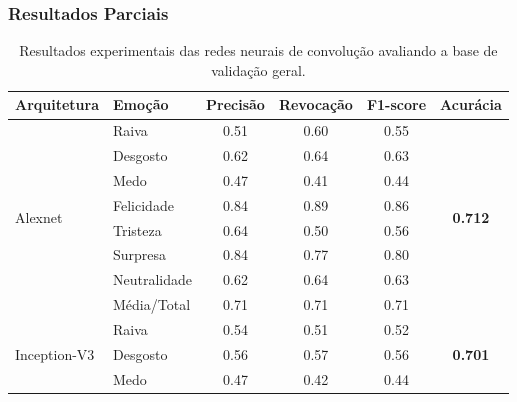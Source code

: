 \documentclass{beamer}
\begin{document}
\begin{frame}
 \frametitle{Resultados Parciais}
\begin{table}[]
\tiny
\centering
\caption{Resultados experimentais das redes neurais de convolução avaliando a base de validação geral.}
\label{table:resultsexp}
\begin{tabular}{llcccc}
\hline
\textbf{Arquitetura}                & \textbf{Emoção}       & \textbf{Precisão} & \textbf{Revocação} & \textbf{F1-score} & \textbf{Acurácia}               \\ \hline
\multirow{8}{*}{Alexnet}            & Raiva                 & 0.51              & 0.60               & 0.55              & \multirow{8}{*}{\scriptsize \textbf{0.712}}          \\
                                    & Desgosto              & 0.62              & 0.64               & 0.63              &                                 \\
                                    & Medo                  & 0.47              & 0.41               & 0.44              &                                 \\
                                    & Felicidade            & 0.84              & 0.89               & 0.86              &                                 \\
                                    & Tristeza              & 0.64              & 0.50               & 0.56              &                                 \\
                                    & Surpresa              & 0.84              & 0.77               & 0.80              &                                 \\
                                    & Neutralidade          & 0.62              & 0.64               & 0.63              &                                 \\
                                    & Média/Total           & 0.71              & 0.71               & 0.71              &                                 \\ \hline
\multirow{8}{*}{Inception-V3}       & Raiva                 & 0.54              & 0.51               & 0.52              & \multirow{8}{*}{\scriptsize \textbf{0.701}}          \\
                                    & Desgosto              & 0.56              & 0.57               & 0.56              &                                 \\
                                    & Medo                  & 0.47              & 0.42               & 0.44              &                                 \\

\end{tabular}
\end{table}
\end{frame}
\end{document}
